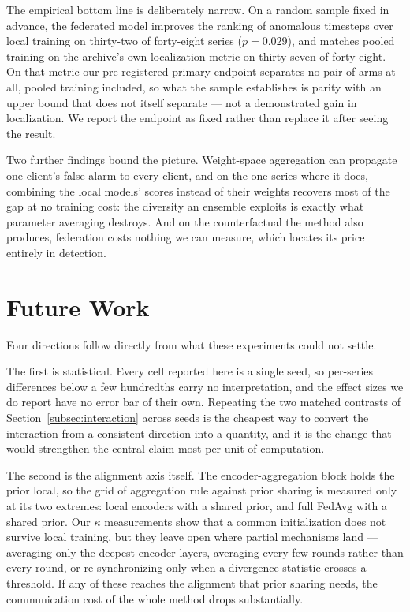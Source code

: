 \documentclass[conference]{IEEEtran}
\begin{document}
The empirical bottom line is deliberately narrow. On a random sample fixed in advance, the
federated model improves the ranking of anomalous timesteps over local training on thirty-two of
forty-eight series ($p=0.029$), and matches pooled training on the archive's own localization
metric on thirty-seven of forty-eight. On that metric our pre-registered primary endpoint separates
no pair of arms at all, pooled training included, so what the sample establishes is parity with an
upper bound that does not itself separate --- not a demonstrated gain in localization. We report
the endpoint as fixed rather than replace it after seeing the result.

Two further findings bound the picture. Weight-space aggregation can propagate one client's false
alarm to every client, and on the one series where it does, combining the local models' scores
instead of their weights recovers most of the gap at no training cost: the diversity an ensemble
exploits is exactly what parameter averaging destroys. And on the counterfactual the method also
produces, federation costs nothing we can measure, which locates its price entirely in detection.

\section{Future Work}
\label{sec:future}

Four directions follow directly from what these experiments could not settle.

The first is statistical. Every cell reported here is a single seed, so per-series differences below
a few hundredths carry no interpretation, and the effect sizes we do report have no error bar of
their own. Repeating the two matched contrasts of Section~\ref{subsec:interaction} across seeds is
the cheapest way to convert the interaction from a consistent direction into a quantity, and it is
the change that would strengthen the central claim most per unit of computation.

The second is the alignment axis itself. The encoder-aggregation block holds the prior local, so the
grid of aggregation rule against prior sharing is measured only at its two extremes: local encoders
with a shared prior, and full FedAvg with a shared prior. Our $\kappa$ measurements show that a
common initialization does not survive local training, but they leave open where partial mechanisms
land --- averaging only the deepest encoder layers, averaging every few rounds rather than every
round, or re-synchronizing only when a divergence statistic crosses a threshold. If any of these
reaches the alignment that prior sharing needs, the communication cost of the whole method drops
substantially.
\end{document}
